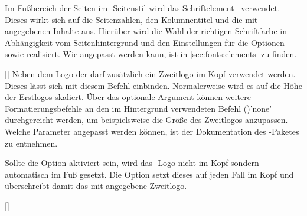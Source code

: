 \begin{Declaration*}{}
\begin{Declaration*}{}
\begin{Declaration*}{}
\begin{Declaration}[v2.04]{}
\printdeclarationlist%
%
%
Im Fußbereich der Seiten im -Seitenstil wird das 
Schriftelement~ verwendet. Dieses wirkt sich auf die 
Seitenzahlen, den Kolumnentitel und die mit  angegebenen 
Inhalte aus. Hierüber wird die Wahl der richtigen Schriftfarbe in Abhängigkeit 
vom Seitenhintergrund und den Einstellungen für die Optionen  
sowie  realisiert. Wie  angepasst werden 
kann, ist in \autoref{sec:fonts:elements} zu finden.
\end{Declaration}

\begin{Declaration}{[\LParameter{}]}
\printdeclarationlist%
%
%
%
%
Neben dem Logo der \TnUD darf zusätzlich ein Zweitlogo im Kopf verwendet 
werden. Dieses lässt sich mit diesem Befehl einbinden. Normalerweise wird es 
auf die Höhe der Erstlogos skaliert. Über das optionale Argument können weitere 
Formatierungsbefehle an den im Hintergrund verwendeten Befehl 
()'none' durchgereicht werden, um 
beispielsweise die Größe des Zweitlogos anzupassen. Welche Parameter angepasst 
werden können, ist der Dokumentation des -Paketes zu 
entnehmen.

Sollte die Option  aktiviert sein, wird das \DDC-Logo nicht im Kopf 
sondern automatisch im Fuß gesetzt. Die Option  setzt dieses 
auf jeden Fall im Kopf und überschreibt damit das mit  
angegebene Zweitlogo.
\end{Declaration}

\begin{Declaration}[v2.03]{%
  [\LParameter{}]%
}
\begin{Declaration}[v2.03]{}%
\begin{Declaration}[v2.03]{}%
\printdeclarationlist%
%
%
%


\end{Declaration}
\end{Declaration}
\end{Declaration}
\end{Declaration*}
\end{Declaration*}
\end{Declaration*}
